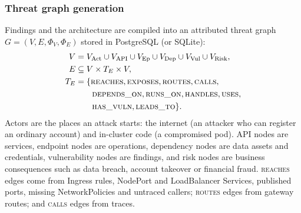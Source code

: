 \documentclass[conference]{IEEEtran}
\begin{document}
\subsubsection{Threat graph generation}
Findings and the architecture are compiled into an attributed threat graph $G=(V,E,\Phi_V,\Phi_E)$ stored in PostgreSQL (or SQLite):
\begin{align}
V &= V_{\mathrm{Act}} \cup V_{\mathrm{API}} \cup V_{\mathrm{Ep}} \cup V_{\mathrm{Dep}} \cup V_{\mathrm{Vul}} \cup V_{\mathrm{Risk}}, \label{eq:v}\\
E &\subseteq V\times T_E\times V, \label{eq:e}\\
T_E &= \{\textsc{reaches},\textsc{exposes},\textsc{routes},\textsc{calls},\nonumber\\
 &\qquad \textsc{depends\_on},\textsc{runs\_on},\textsc{handles},\textsc{uses},\nonumber\\
 &\qquad \textsc{has\_vuln},\textsc{leads\_to}\}. \nonumber
\end{align}
Actors are the places an attack starts: the internet (an attacker who can register an ordinary account) and in-cluster code (a compromised pod). API nodes are services, endpoint nodes are operations, dependency nodes are data assets and credentials, vulnerability nodes are findings, and risk nodes are business consequences such as data breach, account takeover or financial fraud. \textsc{reaches} edges come from Ingress rules, NodePort and LoadBalancer Services, published ports, missing NetworkPolicies and untraced callers; \textsc{routes} edges from gateway routes; and \textsc{calls} edges from traces.
\end{document}
